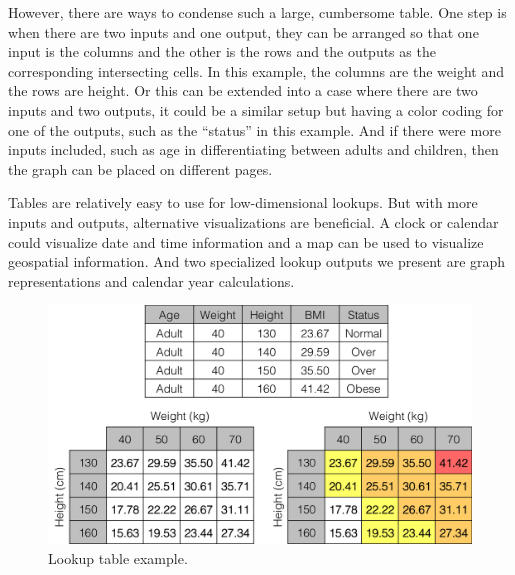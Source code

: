 \documentclass{sig-alternate}
\begin{document}
However, there are ways to condense such a large, cumbersome table.
One step is when there are two inputs and one output, they can be arranged so that one input is the columns and the other is the rows and the outputs as the corresponding intersecting cells. In this example, the columns are the weight and the rows are height. Or this can be extended into a case where there are two inputs and two outputs, it could be a similar setup but having a color coding for one of the outputs, such as the ``status'' in this example. And if there were more inputs included, such as age in differentiating between adults and children, then the graph can be placed on different pages.

Tables are relatively easy to use for low-dimensional lookups. But with more inputs and outputs, alternative visualizations are beneficial. A clock or calendar could visualize date and time information and a map can be used to visualize geospatial information. And two specialized lookup outputs we present are graph representations and calendar year calculations.


\begin{figure}
\centering
\includegraphics[width=\linewidth]{img/table.png}
\caption{Lookup table example.}
\label{fig:table}
\end{figure}
\end{document}
